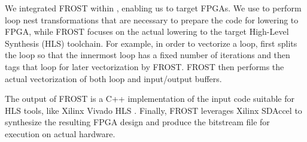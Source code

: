 We integrated FROST within \framework{}, enabling us to target FPGAs.
We use \framework{} to perform loop nest transformations that are necessary to prepare the code for lowering to FPGA, while FROST focuses on the actual lowering to the target High-Level Synthesis (HLS) toolchain.  For example, in order to vectorize a loop, \framework{} first splits the loop so that the innermost loop has a fixed number of iterations and then tags that loop for later vectorization by FROST.
FROST then performs the actual vectorization of both loop and input/output buffers.%

The output of FROST is a C++ implementation of the input code suitable for HLS tools, like Xilinx Vivado HLS \cite{vivado}.
Finally, FROST leverages Xilinx SDAccel to synthesize the resulting FPGA design and produce the bitstream file for execution on actual hardware.

